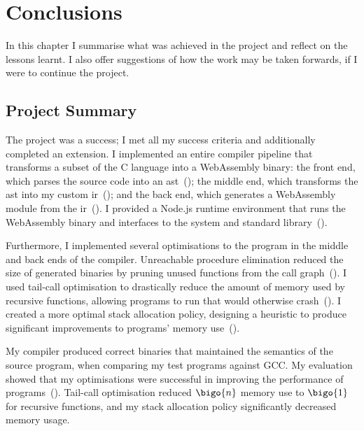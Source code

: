 \documentclass[00-main.tex]{subfiles}
\begin{document}
\chapter{Conclusions}

In this chapter I summarise what was achieved in the project and reflect on the lessons learnt.
I also offer suggestions of how the work may be taken forwards, if I were to continue the project.

\section{Project Summary}

The project was a success; I met all my success criteria and additionally completed an extension.
I implemented an entire compiler pipeline that transforms a subset of the C language into a Web\-Assembly binary: the front end, which parses the source code into an \gls{ast}~(); the middle end, which transforms the \gls{ast} into my custom \gls{ir}~(); and the back end, which generates a WebAssembly module from the \gls{ir}~().
I provided a Node.js runtime environment that runs the WebAssembly binary and interfaces to the system and standard library~().

Furthermore, I implemented several optimisations to the program in the middle and back ends of the compiler.
Unreachable procedure elimination reduced the size of generated binaries by pruning unused functions from the call graph~().
I used tail-call optimisation to drastically reduce the amount of memory used by recursive functions, allowing programs to run that would otherwise crash~().
I created a more optimal stack allocation policy, designing a heuristic to produce significant improvements to programs' memory use~().

My compiler produced correct binaries that maintained the semantics of the source program, when comparing my test programs against GCC\@.
My evaluation showed that my optimisations were successful in improving the performance of programs~().
Tail-call optimisation reduced $\bigo{n}$ memory use to $\bigo{1}$ for recursive functions, and my stack allocation policy significantly decreased memory usage.
\end{document}
